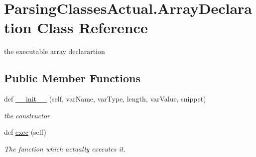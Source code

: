 \hypertarget{class_parsing_classes_actual_1_1_array_declaration}{}\section{Parsing\+Classes\+Actual.\+Array\+Declaration Class Reference}
\label{class_parsing_classes_actual_1_1_array_declaration}


the executable array declarartion  


\subsection*{Public Member Functions}
\begin{DoxyCompactItemize}
\item 
def \hyperlink{class_parsing_classes_actual_1_1_array_declaration_a3c5403f608468a688d68ae1f95a3569e}{\+\_\+\+\_\+init\+\_\+\+\_\+} (self, var\+Name, var\+Type, length, var\+Value, snippet)
\begin{DoxyCompactList}\small\item\em the constructor \end{DoxyCompactList}\item 
def \hyperlink{class_parsing_classes_actual_1_1_array_declaration_a039a011fe347df7f8b5c9cb821839304}{exec} (self)\hypertarget{class_parsing_classes_actual_1_1_array_declaration_a039a011fe347df7f8b5c9cb821839304}{}\label{class_parsing_classes_actual_1_1_array_declaration_a039a011fe347df7f8b5c9cb821839304}

\begin{DoxyCompactList}\small\item\em The function which actually executes it. \end{DoxyCompactList}\end{DoxyCompactItemize}
